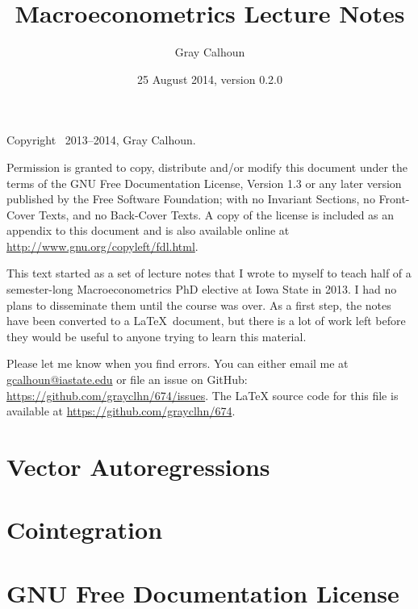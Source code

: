 \documentclass[12pt,notitlepage]{report}
\title{Macroeconometrics Lecture Notes}
\author{Gray Calhoun}
\date{25 August 2014, version 0.2.0}
\begin{document}
\maketitle

\bigskip\noindent%
Copyright \textcopyright\ 2013--2014, Gray Calhoun.

Permission is granted to copy, distribute and/or modify this document
under the terms of the GNU Free Documentation License, Version 1.3 or
any later version published by the Free Software Foundation; with no
Invariant Sections, no Front-Cover Texts, and no Back-Cover Texts.  A
copy of the license is included as an appendix to this document and is
also available online at \url{http://www.gnu.org/copyleft/fdl.html}.

This text started as a set of lecture notes that I
wrote to myself to teach half of a semester-long Macroeconometrics PhD
elective at Iowa State in 2013.  I had no plans to disseminate them
until the course was over.  As a first step, the notes have been
converted to a \LaTeX\ document, but there is a lot of work left
before they would be useful to anyone trying to learn this material.

Please let me know when you find errors. You can either email me at
\url{gcalhoun@iastate.edu} or file an issue on GitHub:
\url{https://github.com/grayclhn/674/issues}. The LaTeX source code
for this file is available at \url{https://github.com/grayclhn/674}.

\tableofcontents
{}
\newpage

\chapter{Vector Autoregressions}





\chapter{Cointegration}




\chapter*{GNU Free Documentation License}



\end{document}
